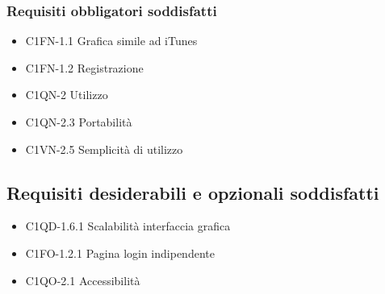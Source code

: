 \subsubsection*{Requisiti obbligatori soddisfatti}
\begin{itemize}
    \item C1FN-1.1 Grafica simile ad iTunes
	\item C1FN-1.2 Registrazione
	\item C1QN-2 Utilizzo
	\item C1QN-2.3 Portabilit\`a
	\item C1VN-2.5 Semplicit\`a di utilizzo
\end{itemize}
\subsection*{Requisiti desiderabili e opzionali soddisfatti}
\begin{itemize}
    \item C1QD-1.6.1 Scalabilit\`a interfaccia grafica
    \item C1FO-1.2.1 Pagina login indipendente
    \item C1QO-2.1 Accessibilit\`a
\end{itemize}
